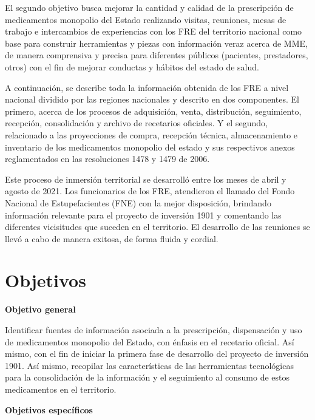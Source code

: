 \documentclass[
]{book}
\begin{document}
El segundo objetivo busca mejorar la cantidad y calidad de la prescripción de medicamentos monopolio del Estado realizando visitas, reuniones, mesas de trabajo e intercambios de experiencias con los FRE del territorio nacional como base para construir herramientas y piezas con información veraz acerca de MME, de manera comprensiva y precisa para diferentes públicos (pacientes, prestadores, otros) con el fin de mejorar conductas y hábitos del estado de salud.

A continuación, se describe toda la información obtenida de los FRE a nivel nacional dividido por las regiones nacionales y descrito en dos componentes. El primero, acerca de los procesos de adquisición, venta, distribución, seguimiento, recepción, consolidación y archivo de recetarios oficiales. Y el segundo, relacionado a las proyecciones de compra, recepción técnica, almacenamiento e inventario de los medicamentos monopolio del estado y sus respectivos anexos reglamentados en las resoluciones 1478 y 1479 de 2006.

Este proceso de inmersión territorial se desarrolló entre los meses de abril y agosto de 2021. Los funcionarios de los FRE, atendieron el llamado del Fondo Nacional de Estupefacientes (FNE) con la mejor disposición, brindando información relevante para el proyecto de inversión 1901 y comentando las diferentes vicisitudes que suceden en el territorio. El desarrollo de las reuniones se llevó a cabo de manera exitosa, de forma fluida y cordial.

\hypertarget{objetivos}{%
\chapter{Objetivos}\label{objetivos}}

\textbf{Objetivo general}

Identificar fuentes de información asociada a la prescripción, dispensación y uso de medicamentos monopolio del Estado, con énfasis en el recetario oficial. Así mismo, con el fin de iniciar la primera fase de desarrollo del proyecto de inversión 1901. Así mismo, recopilar las características de las herramientas tecnológicas para la consolidación de la información y el seguimiento al consumo de estos medicamentos en el territorio.

\textbf{Objetivos específicos}
\end{document}
